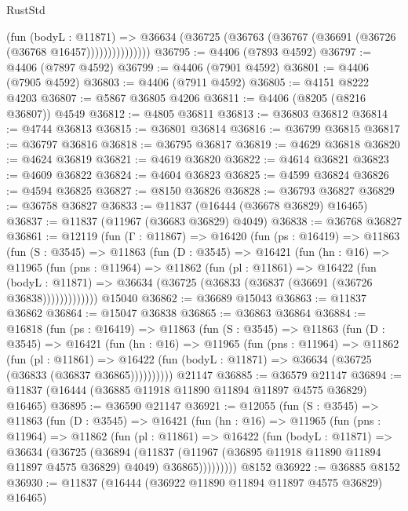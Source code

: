 \begin{lexlean}{RustStd}
\begin{coremodule}
{\begin{coremodule}
{{{{{{{{{{{{{{{{{{{{{{{{{{{{{{{{{{{{{{{{{{{{{{{{{{                    (fun (bodyL : @11871) =>
                    @36634 (@36725 (@36763 (@36767 (@36691 (@36726 (@36768 @16457)))))))))))))))
@36795 := @4406 (@7893 @4592)
@36797 := @4406 (@7897 @4592)
@36799 := @4406 (@7901 @4592)
@36801 := @4406 (@7905 @4592)
@36803 := @4406 (@7911 @4592)
@36805 := @4151 @8222 @4203
@36807 := @5867 @36805 @4206
@36811 := @4406 (@8205 (@8216 @36807)) @4549
@36812 := @4805 @36811
@36813 := @36803 @36812
@36814 := @4744 @36813
@36815 := @36801 @36814
@36816 := @36799 @36815
@36817 := @36797 @36816
@36818 := @36795 @36817
@36819 := @4629 @36818
@36820 := @4624 @36819
@36821 := @4619 @36820
@36822 := @4614 @36821
@36823 := @4609 @36822
@36824 := @4604 @36823
@36825 := @4599 @36824
@36826 := @4594 @36825
@36827 := @8150 @36826
@36828 := @36793 @36827
@36829 := @36758 @36827
@36833 := @11837 (@16444 (@36678 @36829) @16465)
@36837 := @11837 (@11967 (@36683 @36829) @4049)
@36838 := @36768 @36827
@36861 := @12119
    (fun (Γ : @11867) =>
    @16420
      (fun (ps : @16419) =>
      @11863
        (fun (S : @3545) =>
        @11863
          (fun (D : @3545) =>
          @16421
            (fun (hn : @16) =>
            @11965
              (fun (pns : @11964) =>
              @11862
                (fun (pl : @11861) =>
                @16422
                  (fun (bodyL : @11871) =>
                  @36634 (@36725 (@36833 (@36837 (@36691 (@36726 @36838)))))))))))))
    @15040
@36862 := @36689 @15043
@36863 := @11837 @36862
@36864 := @15047 @36838
@36865 := @36863 @36864
@36884 := @16818
    (fun (ps : @16419) =>
    @11863
      (fun (S : @3545) =>
      @11863
        (fun (D : @3545) =>
        @16421
          (fun (hn : @16) =>
          @11965
            (fun (pns : @11964) =>
            @11862
              (fun (pl : @11861) =>
              @16422 (fun (bodyL : @11871) => @36634 (@36725 (@36833 (@36837 @36865))))))))))
    @21147
@36885 := @36579 @21147
@36894 := @11837 (@16444 (@36885 @11918 @11890 @11894 @11897 @4575 @36829) @16465)
@36895 := @36590 @21147
@36921 := @12055
    (fun (S : @3545) =>
    @11863
      (fun (D : @3545) =>
      @16421
        (fun (hn : @16) =>
        @11965
          (fun (pns : @11964) =>
          @11862
            (fun (pl : @11861) =>
            @16422
              (fun (bodyL : @11871) =>
              @36634
                (@36725
                  (@36894
                    (@11837
                      (@11967 (@36895 @11918 @11890 @11894 @11897 @4575 @36829) @4049)
                      @36865)))))))))
    @8152
@36922 := @36885 @8152
@36930 := @11837 (@16444 (@36922 @11890 @11894 @11897 @4575 @36829) @16465)
}}}}}}}}}}}}}}}}}}}}}}}}}}}}}}}}}}}}}}}}}}}}}}}}}}
\end{coremodule}}
\end{coremodule}
\end{lexlean}
